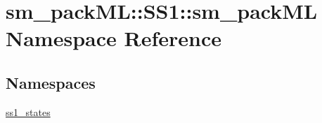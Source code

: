 \hypertarget{namespacesm__packML_1_1SS1_1_1sm__packML}{}\section{sm\+\_\+pack\+ML\+:\+:S\+S1\+:\+:sm\+\_\+pack\+ML Namespace Reference}
\label{namespacesm__packML_1_1SS1_1_1sm__packML}
\subsection*{Namespaces}
\begin{DoxyCompactItemize}
\item 
 \hyperlink{namespacesm__packML_1_1SS1_1_1sm__packML_1_1ss1__states}{ss1\+\_\+states}
\end{DoxyCompactItemize}
